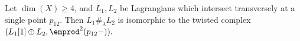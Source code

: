 %

\begin{corollary}
    Let $\dim(X)\geq 4$, and $L_1, L_2$ be Lagrangians which intersect transversely at a single point $p_{12}$. Then $L_1\#_{\lambda} L_2$ is isomorphic to the twisted complex $(L_1[1]\oplus L_2, \emprod^2(p_{12}-)).$
\end{corollary}